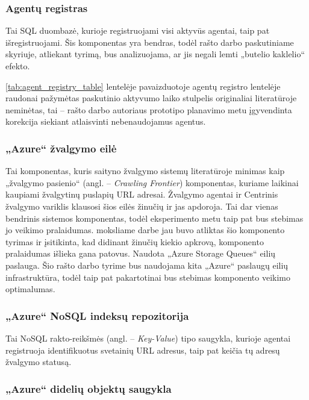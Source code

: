 \subsubsection{Agentų registras}
 
 Tai SQL duombazė, kurioje registruojami visi aktyvūs agentai, taip pat išregistruojami. Šis komponentas yra bendras, todėl rašto darbo paskutiniame skyriuje, atliekant tyrimą, bus analizuojama, ar jis negali lemti „butelio kaklelio“ efekto.
 
 
 
 \ref{tab:agent_registry_table} lentelėje pavaizduotoje agentų registro lentelėje raudonai pažymėtas paskutinio aktyvumo laiko stulpelis originaliai \cite{MercedCloudBasedWebCrawler} literatūroje neminėtas, tai -- rašto darbo autoriaus prototipo planavimo metu įgyvendinta korekcija siekiant atlaisvinti nebenaudojamus agentus.
 
 \subsubsection{„Azure“ žvalgymo eilė}
 
 Tai komponentas, kuris saityno žvalgymo sistemų literatūroje minimas kaip „žvalgymo pasienio“ (angl. -- \textit{Crawling Frontier}) komponentas, kuriame laikinai kaupiami žvalgytinų puslapių URL adresai. Žvalgymo agentai ir Centrinis žvalgymo variklis klausosi šios eilės žinučių ir jas apdoroja. Tai dar vienas bendrinis sistemos komponentas, todėl eksperimento metu taip pat bus stebimas jo veikimo pralaidumas. \cite{MercedCloudBasedWebCrawler} moksliame darbe jau buvo atliktas šio komponento tyrimas ir įsitikinta, kad didinant žinučių kiekio apkrovą, komponento pralaidumas išlieka gana patovus. Naudota „Azure Storage Queues“ eilių paslauga. Šio rašto darbo tyrime bus naudojama kita „Azure“ paslaugų eilių infrastruktūra, todėl taip pat pakartotinai bus stebimas komponento veikimo optimalumas.
 
 \subsubsection{„Azure“ NoSQL indeksų repozitorija}

Tai NoSQL rakto-reikšmės (angl. -- \textit{Key-Value}) tipo saugykla, kurioje agentai registruoja identifikuotus svetainių URL adresus, taip pat keičia tų adresų žvalgymo statusą.

\subsubsection{„Azure“ didelių objektų saugykla}

